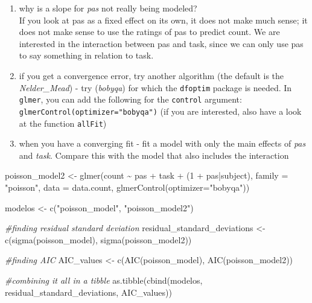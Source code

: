 \documentclass[
]{article}
\newenvironment{Shaded}{\begin{snugshade}}{\end{snugshade}}
\newcommand{\AttributeTok}[1]{\textcolor[rgb]{0.77,0.63,0.00}{#1}}
\newcommand{\CommentTok}[1]{\textcolor[rgb]{0.56,0.35,0.01}{\textit{#1}}}
\newcommand{\DecValTok}[1]{\textcolor[rgb]{0.00,0.00,0.81}{#1}}
\newcommand{\FunctionTok}[1]{\textcolor[rgb]{0.00,0.00,0.00}{#1}}
\newcommand{\NormalTok}[1]{#1}
\newcommand{\OtherTok}[1]{\textcolor[rgb]{0.56,0.35,0.01}{#1}}
\newcommand{\SpecialCharTok}[1]{\textcolor[rgb]{0.00,0.00,0.00}{#1}}
\newcommand{\StringTok}[1]{\textcolor[rgb]{0.31,0.60,0.02}{#1}}
\begin{document}
\begin{enumerate}
\def\labelenumi{\roman{enumi}.}
\setcounter{enumi}{1}
\item
  why is a slope for \emph{pas} not really being modeled?\\
  If you look at pas as a fixed effect on its own, it does not make much
  sense; it does not make sense to use the ratings of pas to predict
  count. We are interested in the interaction between pas and task,
  since we can only use pas to say something in relation to task.
\item
  if you get a convergence error, try another algorithm (the default is
  the \emph{Nelder\_Mead}) - try (\emph{bobyqa}) for which the
  \texttt{dfoptim} package is needed. In \texttt{glmer}, you can add the
  following for the \texttt{control} argument:
  \texttt{glmerControl(optimizer="bobyqa")} (if you are interested, also
  have a look at the function \texttt{allFit})
\item
  when you have a converging fit - fit a model with only the main
  effects of \emph{pas} and \emph{task}. Compare this with the model
  that also includes the interaction
\end{enumerate}

\begin{Shaded}
\begin{Highlighting}[]
\NormalTok{poisson\_model2 }\OtherTok{\textless{}{-}} \FunctionTok{glmer}\NormalTok{(count }\SpecialCharTok{\textasciitilde{}}\NormalTok{ pas }\SpecialCharTok{+}\NormalTok{ task }\SpecialCharTok{+}\NormalTok{ (}\DecValTok{1} \SpecialCharTok{+}\NormalTok{ pas}\SpecialCharTok{|}\NormalTok{subject), }\AttributeTok{family =} \StringTok{"poisson"}\NormalTok{, }\AttributeTok{data =}\NormalTok{ data.count, }\FunctionTok{glmerControl}\NormalTok{(}\AttributeTok{optimizer=}\StringTok{"bobyqa"}\NormalTok{))}

\NormalTok{modelos }\OtherTok{\textless{}{-}} \FunctionTok{c}\NormalTok{(}\StringTok{"poisson\_model"}\NormalTok{, }\StringTok{"poisson\_model2"}\NormalTok{)}

\CommentTok{\#finding residual standard deviation}
\NormalTok{residual\_standard\_deviations }\OtherTok{\textless{}{-}} \FunctionTok{c}\NormalTok{(}\FunctionTok{sigma}\NormalTok{(poisson\_model), }\FunctionTok{sigma}\NormalTok{(poisson\_model2))}

\CommentTok{\#finding AIC}
\NormalTok{AIC\_values }\OtherTok{\textless{}{-}} \FunctionTok{c}\NormalTok{(}\FunctionTok{AIC}\NormalTok{(poisson\_model), }\FunctionTok{AIC}\NormalTok{(poisson\_model2))}

\CommentTok{\#combining it all in a tibble}
\FunctionTok{as.tibble}\NormalTok{(}\FunctionTok{cbind}\NormalTok{(modelos, residual\_standard\_deviations, AIC\_values))}
\end{Highlighting}
\end{Shaded}
\end{document}
